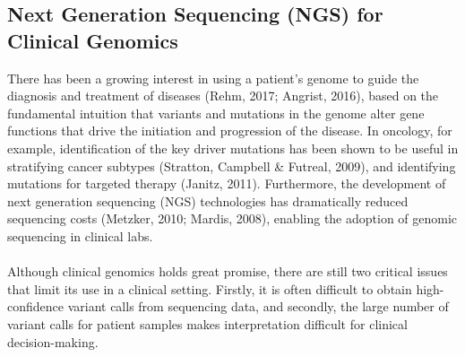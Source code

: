 \documentclass{article}
\begin{document}
\subsection{Next Generation Sequencing (NGS) for Clinical Genomics}
There has been a growing interest in using a patient's genome to guide the diagnosis and treatment of diseases (Rehm, 2017; Angrist, 2016), based on the fundamental intuition that variants and mutations in the genome alter gene functions that drive the initiation and progression of the disease. In oncology, for example, identification of the key driver mutations has been shown to be useful in stratifying cancer subtypes (Stratton, Campbell \& Futreal, 2009), and identifying mutations for targeted therapy (Janitz, 2011). Furthermore, the development of next generation sequencing (NGS) technologies has dramatically reduced sequencing costs (Metzker, 2010; Mardis, 2008), enabling the adoption of genomic sequencing in clinical labs. \\\\ Although clinical genomics holds great promise, there are still two critical issues that limit its use in a clinical setting. Firstly, it is often difficult to obtain high-confidence variant calls from sequencing data, and secondly, the large number of variant calls for patient samples makes interpretation difficult for clinical decision-making.
\end{document}
